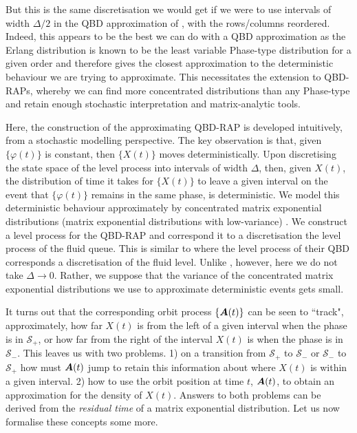 But this is the same discretisation we would get if we were to use intervals of width \(\Delta/2\) in the QBD approximation of \cite{bo2013}, with the rows/columns reordered. Indeed, this appears to be the best we can do with a QBD approximation as the Erlang distribution is known to be the least variable Phase-type distribution for a given order \citep{as1987} and therefore gives the closest approximation to the deterministic behaviour we are trying to approximate. This necessitates the extension to QBD-RAPs, whereby we can find more concentrated distributions than any Phase-type and retain enough stochastic interpretation and matrix-analytic tools. 

Here, the construction of the approximating QBD-RAP is developed intuitively, from a stochastic modelling perspective. The key observation is that, given \(\{\varphi(t)\}\) is constant, then \(\{X(t)\}\) moves deterministically. Upon discretising the state space of the level process into intervals of width \(\Delta\), then, given \(X(t)\), the distribution of time it takes for \(\{X(t)\}\) to leave a given interval on the event that \(\{\varphi(t)\}\) remains in the same phase, is deterministic. We model this deterministic behaviour approximately by concentrated matrix exponential distributions (matrix exponential distributions with low-variance) \cite{ert2006,hstz2016,ert2006,hht2020,mt2021}. We construct a level process for the QBD-RAP and correspond it to a discretisation the level process of the fluid queue. This is similar to \cite{bo2013} where the level process of their QBD corresponds a discretisation of the fluid level. Unlike \cite{bo2013}, however, here we do not take \(\Delta \to 0\). Rather, we suppose that the variance of the concentrated matrix exponential distributions we use to approximate deterministic events gets small. %

It turns out that the corresponding orbit process \(\{\boldsymbol A(t)\}\) can be seen to ``track", approximately, how far \(X(t)\) is from the left of a given interval when the phase is in \(\mathcal S_+\), or how far from the right of the interval \(X(t)\) is when the phase is in \(\mathcal S_-\). This leaves us with two problems. 1) on a transition from \(\mathcal S_+\) to \(\mathcal S_-\) or \(\mathcal S_-\) to \(\mathcal S_+\) how must \(\boldsymbol A(t)\) jump to retain this information about where \(X(t)\) is within a given interval. 2) how to use the orbit position at time \(t\), \(\boldsymbol A(t)\), to obtain an approximation for the density of \(X(t)\). Answers to both problems can be derived from the \emph{residual time} of a matrix exponential distribution. Let us now formalise these concepts some more. 

